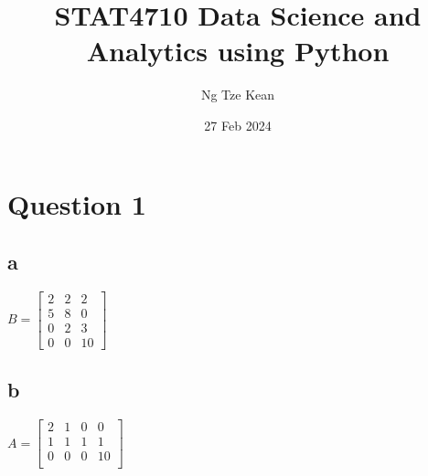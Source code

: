 \documentclass[12pt]{article}
\begin{document}
\title{STAT4710 Data Science and Analytics using Python}
\author{Ng Tze Kean}
\date{27 Feb 2024}
\maketitle

\newpage

\section*{Question 1}
\subsection*{a}

\begin{center}
    $B = \begin{bmatrix}
            2 & 2 & 2  \\
            5 & 8 & 0  \\
            0 & 2 & 3  \\
            0 & 0 & 10
        \end{bmatrix}$
\end{center}

\subsection*{b}

\begin{center}
    $A = \begin{bmatrix}
            2 & 1 & 0 & 0  \\
            1 & 1 & 1 & 1  \\
            0 & 0 & 0 & 10 \\
        \end{bmatrix}$
\end{center}
\end{document}
